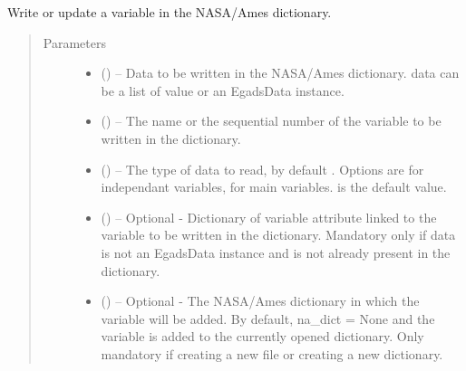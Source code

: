\documentclass[a4paper,10pt,openany,english]{sphinxmanual}
\begin{document}
\begin{fulllineitems}
\begin{fulllineitems}
\end{fulllineitems}


\begin{fulllineitems}
\label{egadsapi:egads.input.nasa_ames_io.NasaAmes.write_variable}
Write or update a variable in the NASA/Ames dictionary.
\begin{quote}\begin{description}
\item[{Parameters}] \leavevmode\begin{itemize}
\item {} 
 () -- Data to be written in the NASA/Ames dictionary. data can be a list of value or an 
EgadsData instance.

\item {} 
 () -- The name or the sequential number of the variable to be written in the 
dictionary.

\item {} 
 () -- The type of data to read, by default . Options are  for 
independant variables,  for main variables.  is the default value.

\item {} 
 () -- Optional - Dictionary of variable attribute linked to the variable to be written in 
the dictionary. Mandatory only if data is not an EgadsData instance and is not 
already present in the dictionary.

\item {} 
 () -- Optional - The NASA/Ames dictionary in which the variable will be added. By default, 
na\_dict = None and the variable is added to the currently opened dictionary. Only 
mandatory if creating a new file or creating a new dictionary.

\end{itemize}

\end{description}\end{quote}

\end{fulllineitems}


\end{fulllineitems}
\end{document}
